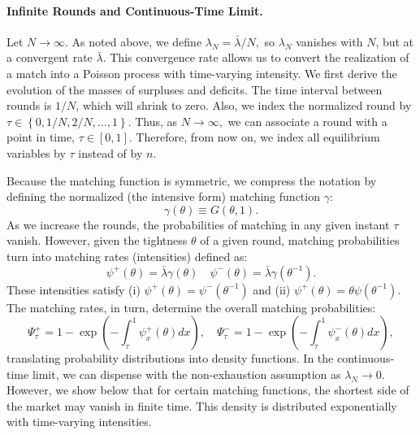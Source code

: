 \documentclass[12pt,american,english,notitlepage]{article}
\begin{document}
\paragraph*{Infinite Rounds and Continuous-Time Limit.}

Let $N\rightarrow\infty$. As noted above, we define $\lambda_{N}=\bar{\lambda}/N,$
so $\lambda_{N}$ vanishes with $N$, but at a convergent rate $\bar{\lambda}$.
This convergence rate allows us to convert the realization of a match
into a Poisson process with time-varying intensity. We first derive
the evolution of the masses of surpluses and deficits. The time interval
between rounds is $1/N$, which will shrink to zero. Also, we index the normalized round by $\tau\in\left\{ 0,1/N,2/N,...,1\right\} $.
Thus, as $N\rightarrow\infty,$ we can associate a round with a point in time, $\tau\in\left[0,1\right]$. Therefore, from now on, we index all equilibrium variables by $\tau$ instead of by $n$.

Because the matching function is symmetric, we compress the notation
by defining the normalized (the intensive form) matching function
$\gamma$:
\[
\gamma\left(\theta\right)\equiv G\left(\theta,1\right).
\]
As we increase the rounds, the probabilities of matching in any given
instant $\tau$ vanish. However, given the tightness $\theta$ of
a given round, matching probabilities turn into matching rates (intensities)
defined as:
\begin{equation}
\label{eq:intensities}
\psi^{+}\left(\theta\right)=\bar{\lambda}\gamma\left(\theta\right)\quad\psi^{-}\left(\theta\right)=\bar{\lambda}\gamma\left(\theta^{-1}\right).
\end{equation}
These intensities satisfy (i) $\psi^{+}\left(\theta\right)=\psi^{-}\left(\theta^{-1}\right)$
and (ii) $\psi^{+}\left(\theta\right)=\theta\psi\left(\theta^{-1}\right)$.
The matching rates, in turn, determine the overall matching probabilities:
\begin{equation}
\label{eq:probabilities}
\Psi_{\tau}^{+}=1-\exp\left(-\int_{\tau}^{1}\psi_{x}^{+}\left(\theta\right)dx\right),\quad\Psi_{\tau}^{-}=1-\exp\left(-\int_{\tau}^{1}\psi_{x}^{-}\left(\theta\right)dx\right),
\end{equation}
translating probability distributions into density functions. In the
continuous-time limit, we can dispense with the non-exhaustion assumption
as $\lambda_{N}\rightarrow0$. However, we show below that for certain
matching functions, the shortest side of the market may vanish in finite
time. This density is distributed exponentially with time-varying intensities.
\end{document}
